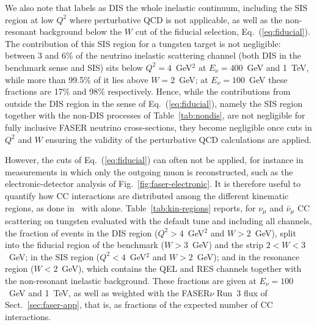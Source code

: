 We also note that  \genie labels as DIS the whole inelastic continuum, including the SIS region at low $Q^2$ where perturbative QCD is not applicable, as well as the non-resonant background below the $W$ cut of the fiducial selection, Eq.~(\ref{eq:fiducial}). 
%
The contribution of this SIS region for a tungsten target is not negligible: between 3 and 6\% of the neutrino inelastic scattering channel (both DIS in the benchmark sense and SIS) sits below $Q^2 = 4$~GeV$^2$ at $E_\nu=400$~GeV and 1~TeV, while more than 99.5\% of it lies above $W = 2$~GeV; at $E_\nu=100$~GeV these fractions are 17\% and 98\% respectively.  
%
Hence, while the contributions from outside the DIS region in the sense of Eq.~(\ref{eq:fiducial}), namely the SIS region together with the non-DIS processes of Table~\ref{tab:nondis}, are not negligible for fully inclusive FASER neutrino cross-sections, they become negligible once cuts in $Q^2$ and $W$ ensuring the validity of the perturbative QCD calculations are applied.

However, the cuts of Eq.~(\ref{eq:fiducial}) can often not be applied, for instance in measurements in which only the outgoing muon is reconstructed, such as the electronic-detector analysis of Fig.~\ref{fig:faser-electronic}.
%
It is therefore useful to quantify how CC interactions are distributed among the different kinematic regions, as done in~\cite{Feng:2022inv} with \pythia alone.
%
Table~\ref{tab:kin-regions} reports, for $\nu_\mu$ and $\bar\nu_\mu$ CC scattering on tungsten evaluated with the default \genie tune and including all channels, the fraction of events in the DIS region ($Q^2>4$~GeV$^2$ and $W>2$~GeV), split into the fiducial region of the benchmark ($W>3$~GeV) and the strip $2<W<3$~GeV; in the SIS region ($Q^2<4$~GeV$^2$ and $W>2$~GeV); and in the resonance region ($W<2$~GeV), which contains the QEL and RES channels together with the non-resonant inelastic background.
%
These fractions are given at $E_\nu=100$~GeV and 1~TeV, as well as weighted with the FASER$\nu$ Run~3 flux of Sect.~\ref{sec:faser-app}, that is, as fractions of the expected number of CC interactions.

